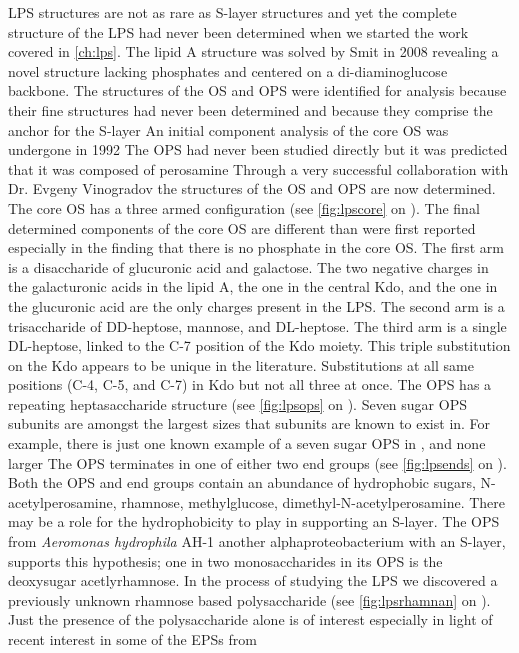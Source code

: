 \ac{LPS} structures are not as rare as \ac{S-layer} structures and yet the complete structure of the \caulobacter{} \ac{LPS} had never been determined when we started the work covered in \cref{ch:lps}. The \caulobacter{} lipid A structure was solved by Smit \etal{} in 2008 revealing a novel structure lacking phosphates and centered on a di-diaminoglucose backbone. The structures of the \ac{OS} and \ac{OPS} were identified for analysis because their fine structures had never been determined and because they comprise the anchor for the \caulobacter{} \ac{S-layer} An initial component analysis of the core \ac{OS} was undergone in 1992 The \ac{OPS} had never been studied directly but it was predicted that it was composed of perosamine Through a very successful collaboration with Dr. Evgeny Vinogradov the structures of the \caulobacter{} \ac{OS} and \ac{OPS} are now determined. The core \ac{OS} has a three armed configuration (see \cref{fig:lpscore} on ). The final determined components of the core \ac{OS} are different than were first reported especially in the finding that there is no phosphate in the core \ac{OS}. The first arm is a disaccharide of glucuronic acid and galactose. The two negative charges in the galacturonic acids in the lipid A, the one in the central Kdo, and the one in the glucuronic acid are the only charges present in the \caulobacter{} \ac{LPS}. The second arm is a trisaccharide of DD-heptose, mannose, and DL-heptose. The third arm is a single DL-heptose, linked to the C-7 position of the Kdo moiety. This triple substitution on the Kdo appears to be unique in the literature. Substitutions at all same positions (C-4, C-5, and C-7) in Kdo but not all three at once. The \ac{OPS} has a repeating heptasaccharide structure (see \cref{fig:lpsops} on ). Seven sugar \ac{OPS} subunits are amongst the largest sizes that subunits are known to exist in. For example, there is just one known example of a seven sugar \ac{OPS} in \ecoli{}, and none larger The \caulobacter{} \ac{OPS} terminates in one of either two end groups (see \cref{fig:lpsends} on ). Both the \ac{OPS} and end groups contain an abundance of hydrophobic sugars, \ie N-acetylperosamine, rhamnose, methylglucose, dimethyl-N-acetylperosamine. There may be a role for the hydrophobicity to play in supporting an \ac{S-layer}. The \ac{OPS} from \textit{Aeromonas hydrophila} AH-1 another alphaproteobacterium with an \ac{S-layer}, supports this hypothesis; one in two monosaccharides in its \ac{OPS} is the deoxysugar acetlyrhamnose. In the process of studying the \caulobacter{} \ac{LPS} we discovered a previously unknown rhamnose based polysaccharide (see \cref{fig:lpsrhamnan} on ). Just the presence of the polysaccharide alone is of interest especially in light of recent interest in some of the \acp{EPS} from \caulobacter{}  

